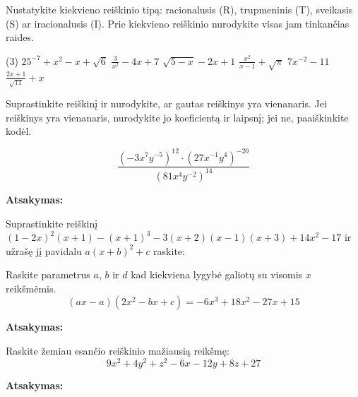 \documentclass[12pt]{exam}
\newcommand{\atsakymas}{%
    \par\vspace{0.3cm}
    \textbf{Atsakymas:} \framebox[7cm]{\rule{0pt}{0.7cm}}
}
\begin{document}
\begin{questions}

\question[6] Nustatykite kiekvieno reiškinio tipą: racionalusis (R), trupmeninis (T), sveikasis (S) ar iracionalusis (I). Prie kiekvieno reiškinio nurodykite visas jam tinkančias raides.
\droppoints
\begin{tasks}[label-width=1.2em](3)
    \task $25^{-7}+x^2-x+\sqrt{6}$
    \task $\frac{3}{x ^{2} }-4x+7$
    \task $\sqrt{5-x}-2x+1$
    \task $\frac{x ^{2} }{x-1}+\sqrt{\pi}$
    \task $7x^{-2}-11$
    \task $\frac{2x+1}{\sqrt{11}}+x$
\end{tasks}



\question[5] Suprastinkite reiškinį ir nurodykite, ar gautas reiškinys yra vienanaris. Jei reiškinys yra vienanaris, nurodykite jo koeficientą ir laipsnį; jei ne, paaiškinkite kodėl.

\droppoints
    $$\displaystyle \frac{(-3x^7y^{-5})^{12}\cdot(27x^{-1}y^4)^{-20}}{(81x^4y^{-2})^{14}}$$

\vspace{3cm}
\atsakymas

\question Suprastinkite reiškinį $(1-2x)^2(x+1)-(x+1)^3-3(x+2)(x-1)(x+3)+14x ^{2} -17
$ ir užrašę jį pavidalu $a(x+b)^2+c$ raskite:


\question[5] Raskite parametrus $a$, $b$ ir $d$ kad kiekviena lygybė galiotų su visomis $x$ reikšmėmis.
\droppoints
$$ (ax-a)(2x ^{2} -bx+c) = -6 x^3+18 x^2-27 x+15 $$  

\vspace{5cm}
\atsakymas

\question[4] Raskite žemiau esančio reiškinio mažiausią reikšmę:
\droppoints
$$9 x^2+4 y^2+z^2-6 x-12 y+8 z+27$$

\vspace{5cm}
\atsakymas

\end{questions}
\end{document}
